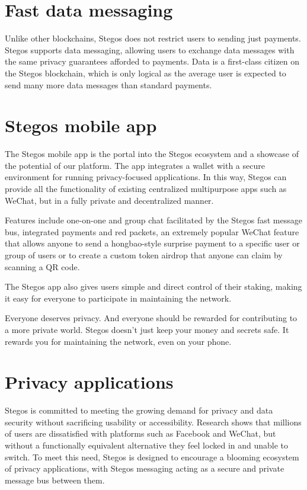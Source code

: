 \documentclass[8pt,fleqn,openany]{book}
\begin{document}
	\section{Fast data messaging}
	Unlike other blockchains, Stegos does not restrict users to sending just payments. Stegos supports data messaging, allowing users to exchange data messages with the same privacy guarantees afforded to payments. Data is a first-class citizen on the Stegos blockchain, which is only logical as the average user is expected to send many more data messages than standard payments.
	
	\section{Stegos mobile app}
	The Stegos mobile app is the portal into the Stegos ecosystem and a showcase of the potential of our platform. The app integrates a wallet with a secure environment for running privacy-focused applications. In this way, Stegos can provide all the functionality of existing centralized multipurpose apps such as WeChat, but in a fully private and decentralized manner. 
	
	Features include one-on-one and group chat facilitated by the Stegos fast message bus, integrated payments and red packets, an extremely popular WeChat feature that allows anyone to send a hongbao-style surprise payment to a specific user or group of users or to create a custom token airdrop that anyone can claim by scanning a QR code.
	
	The Stegos app also gives users simple and direct control of their staking, making it easy for everyone to participate in maintaining the network. 
	
	Everyone deserves privacy. And everyone should be rewarded for contributing to a more private world. Stegos doesn't just keep your money and secrets safe. It rewards you for maintaining the network, even on your phone.
	
	\section{Privacy applications}
	Stegos is committed to meeting the growing demand for privacy and data security without sacrificing usability or accessibility. Research shows that millions of users are dissatisfied with platforms such as Facebook and WeChat, but without a functionally equivalent alternative they feel locked in and unable to switch. To meet this need, Stegos is designed to encourage a blooming ecosystem of privacy applications, with Stegos messaging acting as a secure and private message bus between them.      
	
\end{document}

